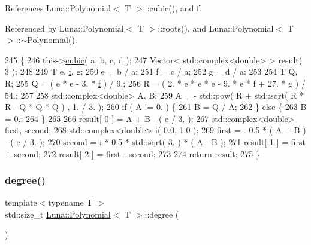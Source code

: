 References Luna\+::\+Polynomial$<$ T $>$\+::cubic(), and f.



Referenced by Luna\+::\+Polynomial$<$ T $>$\+::roots(), and Luna\+::\+Polynomial$<$ T $>$\+::$\sim$\+Polynomial().


\begin{DoxyCode}
245     \{
246         this->\hyperlink{classLuna_1_1Polynomial_af1becea2a2199ca5401a326549561486}{cubic}( a, b, c, d );
247         Vector< std::complex<double> > result( 3 );
248 
249         T e, \hyperlink{Nonlinear__ODE__BVP_8cpp_a06fc87d81c62e9abb8790b6e5713c55ba7ce756344023b99e5ab27b804feb765c}{f}, g;
250         e = b / a;
251         f = c / a;
252         g = d / a;
253 
254         T Q, R;
255         Q = ( e * e - 3. * \hyperlink{Nonlinear__ODE__BVP_8cpp_a06fc87d81c62e9abb8790b6e5713c55ba7ce756344023b99e5ab27b804feb765c}{f} ) / 9.;
256         R = ( 2. * e * e * e - 9. * e * f + 27. * g ) / 54.;
257 
258         std::complex<double> A, B;
259         A = - std::pow( R + std::sqrt( R * R - Q * Q * Q ) , 1. / 3. );
260         \textcolor{keywordflow}{if} ( A != 0. ) \{
261             B = Q / A;
262         \} \textcolor{keywordflow}{else} \{
263             B = 0.;
264         \}
265 
266         result[ 0 ] = A + B - ( e / 3. );
267         std::complex<double> first, second;
268         std::complex<double> i( 0.0, 1.0 );
269         first  = - 0.5 * ( A + B ) - ( e / 3. );
270         second = i * 0.5 * std::sqrt( 3. ) * ( A - B );
271         result[ 1 ] = first + second;
272         result[ 2 ] = first - second;
273 
274         \textcolor{keywordflow}{return} result;
275     \}
\end{DoxyCode}
\mbox{\label{classLuna_1_1Polynomial_ae5ea66d8b21609ec180ec21c539aa944}} 
\subsubsection{\texorpdfstring{degree()}{degree()}}
{\footnotesize\ttfamily template$<$typename T $>$ \\
std\+::size\+\_\+t \hyperlink{classLuna_1_1Polynomial}{Luna\+::\+Polynomial}$<$ T $>$\+::degree (\begin{DoxyParamCaption}{ }\end{DoxyParamCaption})\hspace{0.3cm}{\ttfamily [inline]}}



